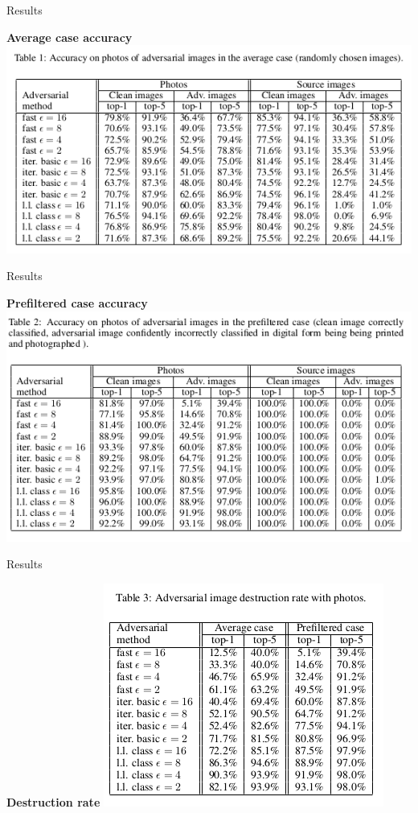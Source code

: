 \documentclass[15pt]{beamer}
\begin{document}
\begin{frame}{Results}
  \begin{center}
  \textbf{Average case accuracy}
  \vskip0.1in
  \includegraphics[width=\linewidth]{tab1.png}
  \end{center}
\end{frame}


\begin{frame}{Results}
  \begin{center}
  \textbf{Prefiltered case accuracy}
  \vskip0.1in
  \includegraphics[width=0.9\linewidth]{tab2.png}
  \end{center}
\end{frame}


\begin{frame}{Results}
  \begin{center}
  \textbf{Destruction rate}
  \vskip0.1in
  \includegraphics[width=0.65\linewidth]{tab3.png}
  \end{center}
\end{frame}
\end{document}
